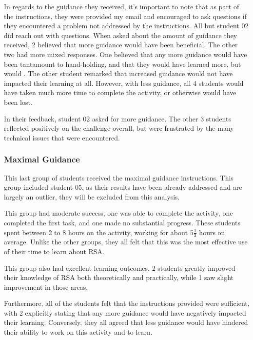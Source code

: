             In regards to the guidance they received, it's important to note that as part of the instructions, they were provided my email and encouraged to ask questions if they encountered a problem not addressed by the instructions. %
All but student 02 did reach out with questions. %
When asked about the amount of guidance they received, 2 believed that more guidance would have been beneficial. The other two had more mixed responses. %
One believed that any more guidance would have been tantamount to hand-holding, and that they would have learned more, but would . %
The other student remarked that increased guidance would not have impacted their learning at all. %
However, with less guidance, all 4 students would have taken much more time to complete the activity, or otherwise would have been lost. 

            In their feedback, student 02 asked for more guidance. %
The other 3 students reflected positively on the challenge overall, but were frustrated by the many technical issues that were encountered. 

        \subsubsection*{Maximal Guidance}
            This last group of students received the maximal guidance instructions. %
This group included student 05, as their results have been already addressed and are largely an outlier, they will be excluded from this analysis. 

            This group had moderate success, one was able to complete the activity, one completed the first task, and one made no substantial progress. %
These students spent between 2 to 8 hours on the activity, working for about 5$\frac{1}{3}$ hours on average. %
Unlike the other groups, they all felt that this was the most effective use of their time to learn about RSA. 

            This group also had excellent learning outcomes. %
2 students greatly improved their knowledge of RSA both theoretically and practically, while 1 saw slight improvement in those areas. 

            Furthermore, all of the students felt that the instructions provided were sufficient, with 2 explicitly stating that any more guidance would have negatively impacted their learning. %
Conversely, they all agreed that less guidance would have hindered their ability to work on this activity and to learn.


